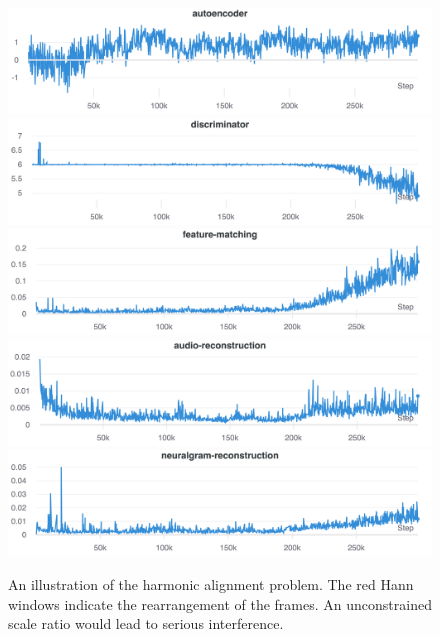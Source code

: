 \documentclass[12pt]{article}
\begin{document}
\begin{appendices}
\begin{figure}
\begin{center}
  \includegraphics[width=\textwidth]{assets/figures/loss/a}
  \includegraphics[width=\textwidth]{assets/figures/loss/d}
  \includegraphics[width=\textwidth]{assets/figures/loss/fm}
  \includegraphics[width=\textwidth]{assets/figures/loss/ar}
  \includegraphics[width=\textwidth]{assets/figures/loss/nr}
\end{center}
\caption{An illustration of the harmonic alignment problem. The red Hann windows indicate the rearrangement of the frames. An unconstrained scale ratio would lead to serious interference.}
\label{fig:healthy-d}
\end{figure}

\end{appendices}
\end{document}
